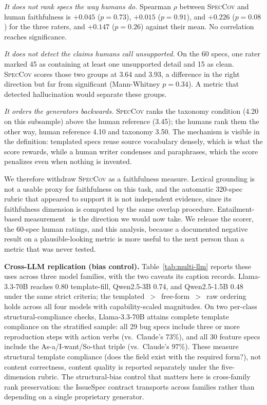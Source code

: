 \documentclass[preprint,12pt]{elsarticle}
\begin{document}
\emph{It does not rank specs the way humans do.} Spearman $\rho$ between \textsc{SpecCov} and
human faithfulness is $+0.045$ ($p = 0.73$), $+0.015$ ($p = 0.91$), and $+0.226$ ($p = 0.08$) for
the three raters, and $+0.147$ ($p = 0.26$) against their mean. No correlation reaches
significance.

\emph{It does not detect the claims humans call unsupported.} On the 60 specs, one rater marked
45 as containing at least one unsupported detail and 15 as clean. \textsc{SpecCov} scores those
two groups at 3.64 and 3.93, a difference in the right direction but far from significant
(Mann-Whitney $p = 0.34$). A metric that detected hallucination would separate these groups.

\emph{It orders the generators backwards.} \textsc{SpecCov} ranks the taxonomy condition (4.20 on this subsample) above the human
reference (3.45); the humans rank them the other way, human
reference 4.10 and taxonomy 3.50. The mechanism is visible in the definition: templated specs
reuse source vocabulary densely, which is what the score rewards, while a human writer condenses
and paraphrases, which the score penalizes even when nothing is invented.

We therefore withdraw \textsc{SpecCov} as a faithfulness measure. Lexical grounding is not a
usable proxy for faithfulness on this task, and the automatic 320-spec rubric that appeared to
support it is not independent evidence, since its faithfulness dimension is computed by the same
overlap procedure. Entailment-based measurement~\cite{laban2022summac, honovich2022true,
durmus2020feqa} is the direction we would now take. We release the scorer, the 60-spec human
ratings, and this analysis, because a documented negative result on a plausible-looking metric
is more useful to the next person than a metric that was never tested.

\textbf{Cross-LLM replication (bias control).} Table~\ref{tab:multi-llm} reports these uses across three model families, with the two caveats its caption records. Llama-3.3-70B reaches 0.80 template-fill, Qwen2.5-3B 0.74, and Qwen2.5-1.5B 0.48 under the same strict criteria; the templated~$>$~free-form~$>$~raw ordering holds across all four models with capability-scaled magnitudes. On two per-class structural-compliance checks, Llama-3.3-70B attains complete template compliance on the stratified sample: all 29 bug specs include three or more reproduction steps with action verbs (vs.\ Claude's 73\%), and all 30 feature specs include the As-a/I-want/So-that triple (vs.\ Claude's 97\%). These measure structural template compliance (does the field exist with the required form?), not content correctness, content quality is reported separately under the five-dimension rubric. The structural-bias control that matters here is cross-family rank preservation: the IssueSpec contract transports across families rather than depending on a single proprietary generator.
\end{document}
